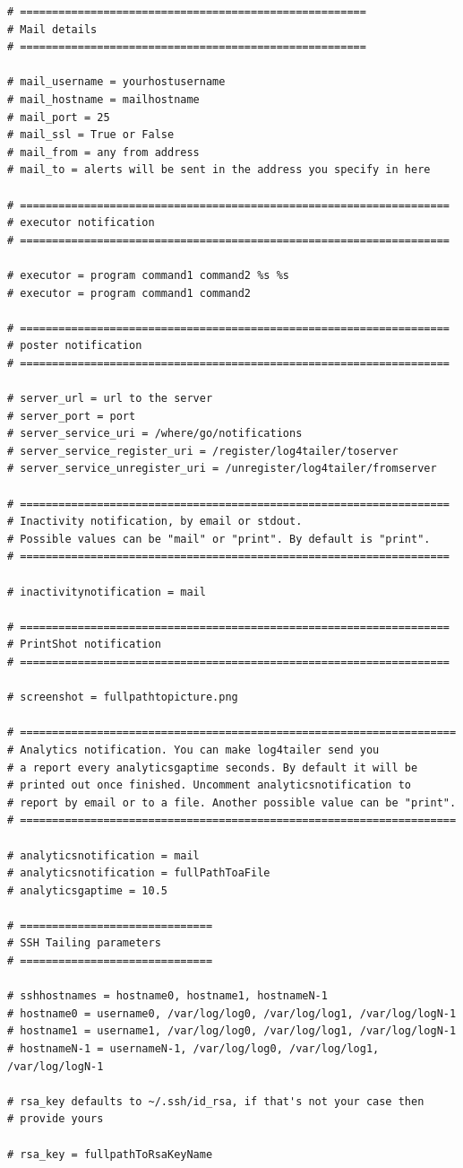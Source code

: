 \begin{verbatim}
# ======================================================
# Mail details 
# ======================================================

# mail_username = yourhostusername
# mail_hostname = mailhostname
# mail_port = 25
# mail_ssl = True or False
# mail_from = any from address
# mail_to = alerts will be sent in the address you specify in here

# ===================================================================
# executor notification
# ===================================================================

# executor = program command1 command2 %s %s
# executor = program command1 command2 

# ===================================================================
# poster notification
# ===================================================================

# server_url = url to the server
# server_port = port
# server_service_uri = /where/go/notifications
# server_service_register_uri = /register/log4tailer/toserver
# server_service_unregister_uri = /unregister/log4tailer/fromserver

# ===================================================================
# Inactivity notification, by email or stdout.
# Possible values can be "mail" or "print". By default is "print".
# ===================================================================

# inactivitynotification = mail

# ===================================================================
# PrintShot notification
# ===================================================================

# screenshot = fullpathtopicture.png

# ====================================================================
# Analytics notification. You can make log4tailer send you 
# a report every analyticsgaptime seconds. By default it will be 
# printed out once finished. Uncomment analyticsnotification to 
# report by email or to a file. Another possible value can be "print".
# ====================================================================

# analyticsnotification = mail
# analyticsnotification = fullPathToaFile
# analyticsgaptime = 10.5

# ==============================
# SSH Tailing parameters
# ==============================

# sshhostnames = hostname0, hostname1, hostnameN-1
# hostname0 = username0, /var/log/log0, /var/log/log1, /var/log/logN-1
# hostname1 = username1, /var/log/log0, /var/log/log1, /var/log/logN-1
# hostnameN-1 = usernameN-1, /var/log/log0, /var/log/log1, /var/log/logN-1

# rsa_key defaults to ~/.ssh/id_rsa, if that's not your case then 
# provide yours

# rsa_key = fullpathToRsaKeyName 


\end{verbatim}

\newpage
